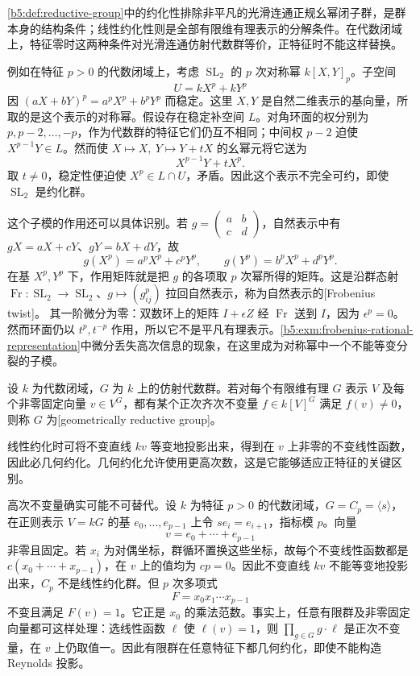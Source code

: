 \cref{b5:def:reductive-group}中的约化性排除非平凡的光滑连通正规幺幂闭子群，是群本身的结构条件；线性约化性则是全部有限维有理表示的分解条件。在代数闭域上，特征零时这两种条件对光滑连通仿射代数群等价，正特征时不能这样替换。

\ProseParagraphBreak
例如在特征 \(p>0\) 的代数闭域上，考虑 \(\operatorname{SL}_2\) 的 \(p\) 次对称幂 \(k[X,Y]_p\)。子空间
\[
	U=kX^p+kY^p
\]
因 \((aX+bY)^p=a^pX^p+b^pY^p\) 而稳定。这里 \(X,Y\) 是自然二维表示的基向量，所取的是这个表示的对称幂。假设存在稳定补空间 \(L\)。对角环面的权分别为 \(p,p-2,\ldots,-p\)，作为代数群的特征它们仍互不相同；中间权 \(p-2\) 迫使 \(X^{p-1}Y\in L\)。然而使 \(X\mapsto X,\ Y\mapsto Y+tX\) 的幺幂元将它送为
\[
	X^{p-1}Y+tX^p.
\]
取 \(t\ne0\)，稳定性便迫使 \(X^p\in L\cap U\)，矛盾。因此这个表示不完全可约，即使 \(\operatorname{SL}_2\) 是约化群。

\ProseParagraphBreak
这个子模的作用还可以具体识别。若
\(g=\begin{pmatrix}a&b\\c&d\end{pmatrix}\)，自然表示中有
\(gX=aX+cY\)、\(gY=bX+dY\)，故
\[
	g(X^p)=a^pX^p+c^pY^p,\qquad g(Y^p)=b^pX^p+d^pY^p.
\]
在基 \(X^p,Y^p\) 下，作用矩阵就是把 \(g\) 的各项取 \(p\) 次幂所得的矩阵。这是沿群态射 \(\operatorname{Fr}:\operatorname{SL}_2\to\operatorname{SL}_2\)、\(g\mapsto(g_{ij}^p)\) 拉回自然表示，称为自然表示的[Frobenius twist]。 其一阶微分为零：双数环上的矩阵 \(I+\epsilon Z\) 经 \(\operatorname{Fr}\) 送到 \(I\)，因为 \(\epsilon^p=0\)。然而环面仍以 \(t^p,t^{-p}\) 作用，所以它不是平凡有理表示。\cref{b5:exm:frobenius-rational-representation}中微分丢失高次信息的现象，在这里成为对称幂中一个不能等变分裂的子模。

\begin{definition}\label{b5:def:geometrically-reductive}
	设 \(k\) 为代数闭域，\(G\) 为 \(k\) 上的仿射代数群。若对每个有限维有理 \(G\) 表示 \(V\) 及每个非零固定向量 \(v\in V^G\)，都有某个正次齐次不变量 \(f\in k[V]^G\) 满足 \(f(v)\ne0\)，则称 \(G\) 为[geometrically reductive group]。
\end{definition}

线性约化时可将不变直线 \(kv\) 等变地投影出来，得到在 \(v\) 上非零的不变线性函数，因此必几何约化。几何约化允许使用更高次数，这是它能够适应正特征的关键区别。

\ProseParagraphBreak
高次不变量确实可能不可替代。设 \(k\) 为特征 \(p>0\) 的代数闭域，\(G=C_p=\langle s\rangle\)，在正则表示 \(V=kG\) 的基 \(e_0,\ldots,e_{p-1}\) 上令 \(se_i=e_{i+1}\)，指标模 \(p\)。向量
\[
	v=e_0+\cdots+e_{p-1}
\]
非零且固定。若 \(x_i\) 为对偶坐标，群循环置换这些坐标，故每个不变线性函数都是 \(c(x_0+\cdots+x_{p-1})\)，在 \(v\) 上的值均为 \(cp=0\)。因此不变直线 \(kv\) 不能等变地投影出来，\(C_p\) 不是线性约化群。但 \(p\) 次多项式
\[
	F=x_0x_1\cdots x_{p-1}
\]
不变且满足 \(F(v)=1\)。它正是 \(x_0\) 的乘法范数。事实上，任意有限群及非零固定向量都可这样处理：选线性函数 \(\ell\) 使 \(\ell(v)=1\)，则 \(\prod_{g\in G}g\cdot\ell\) 是正次不变量，在 \(v\) 上仍取值一。因此有限群在任意特征下都几何约化，即使不能构造 Reynolds 投影。


